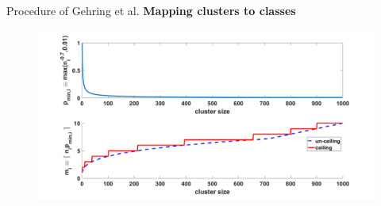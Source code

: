 \documentclass{beamer}
\begin{document}
{\begin{frame}{Procedure of Gehring et al.}
	\textbf{Mapping clusters to classes}	
	\vspace{3mm}		
	\begin{figure}[H]
		\centering
		\includegraphics[width=\textwidth]{figures/clu2cla}
	\end{figure}
\end{frame}	


}
\end{document}
